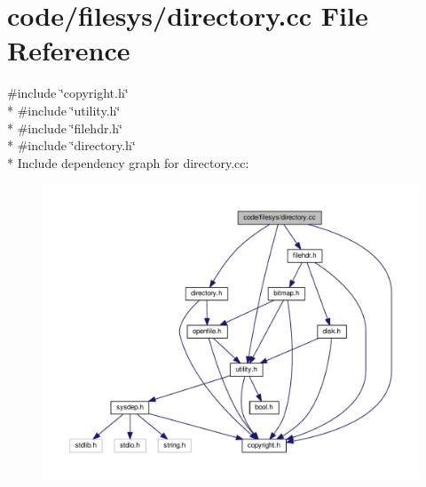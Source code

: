 \section{code/filesys/directory.cc File Reference}
\label{directory_8cc}
{\ttfamily \#include \char`\"{}copyright.\+h\char`\"{}}\\*
{\ttfamily \#include \char`\"{}utility.\+h\char`\"{}}\\*
{\ttfamily \#include \char`\"{}filehdr.\+h\char`\"{}}\\*
{\ttfamily \#include \char`\"{}directory.\+h\char`\"{}}\\*
Include dependency graph for directory.\+cc\+:
\nopagebreak
\begin{figure}[H]
\begin{center}
\leavevmode
\includegraphics[width=350pt]{directory_8cc__incl}
\end{center}
\end{figure}
